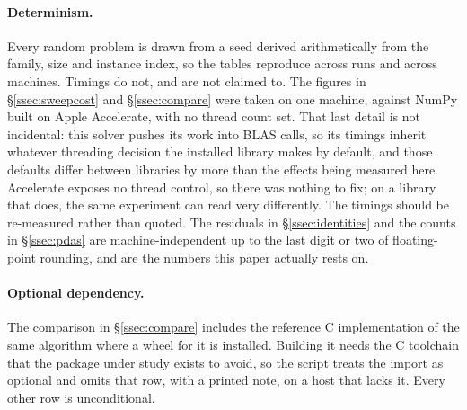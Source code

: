 \paragraph{Determinism.} Every random problem is drawn from a seed derived
arithmetically from the family, size and instance index, so the tables reproduce
across runs and across machines. Timings do not, and are not claimed to. The
figures in \S\ref{ssec:sweepcost} and \S\ref{ssec:compare} were taken on one
machine, against NumPy built on Apple Accelerate, with no thread count set. That
last detail is not incidental: this solver pushes its work into BLAS calls, so its
timings inherit whatever threading decision the installed library makes by
default, and those defaults differ between libraries by more than the effects
being measured here. Accelerate exposes no thread control, so there was nothing to
fix; on a library that does, the same experiment can read very differently. The
timings should be re-measured rather than quoted. The residuals in \S\ref{ssec:identities} and the counts in
\S\ref{ssec:pdas} are machine-independent up to the last digit or two of
floating-point rounding, and are the numbers this paper actually rests on.

\paragraph{Optional dependency.} The comparison in \S\ref{ssec:compare} includes
the reference C implementation of the same algorithm where a wheel for it is
installed. Building it needs the C toolchain that the package under study exists
to avoid, so the script treats the import as optional and omits that row, with a
printed note, on a host that lacks it. Every other row is unconditional.
